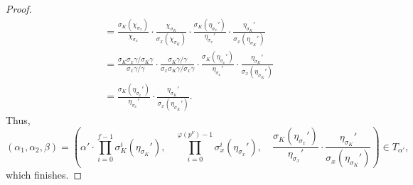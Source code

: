 \begin{proof}
\begin{align*}
		&= \frac{\sigma_K\left(\chi_{\sigma_x}\right)}{\chi_{\sigma_x}}\cdot\frac{\chi_{\sigma_K}}{\sigma_x\left(\chi_{\sigma_K}\right)}\cdot\frac{\sigma_K\left(\eta_{\sigma_x}'\right)}{\eta_{\sigma_x}'}\cdot\frac{\eta_{\sigma_K}'}{\sigma_x\left(\eta_{\sigma_K}'\right)} \\
		&= \frac{\sigma_K\sigma_x\gamma/\sigma_K\gamma}{\sigma_x\gamma/\gamma}\cdot\frac{\sigma_K\gamma/\gamma}{\sigma_x\sigma_K\gamma/\sigma_x\gamma}\cdot\frac{\sigma_K\left(\eta_{\sigma_x}'\right)}{\eta_{\sigma_x}'}\cdot\frac{\eta_{\sigma_K}'}{\sigma_x\left(\eta_{\sigma_K}'\right)} \\
		&= \frac{\sigma_K\left(\eta_{\sigma_x}'\right)}{\eta_{\sigma_x}'}\cdot\frac{\eta_{\sigma_K}'}{\sigma_x\left(\eta_{\sigma_K}'\right)}.
	\end{align*}
	Thus,
	\[(\alpha_1,\alpha_2,\beta)=\left(\alpha'\cdot\prod_{i=0}^{f-1}\sigma_K^i\left(\eta_{\sigma_K}'\right),\quad\prod_{i=0}^{\varphi\left(p^\nu\right)-1}\sigma_x^i\left(\eta_{\sigma_x}'\right),\quad\frac{\sigma_K\left(\eta_{\sigma_x}'\right)}{\eta_{\sigma_x}'}\cdot\frac{\eta_{\sigma_K}'}{\sigma_x\left(\eta_{\sigma_K}'\right)}\right)\in T_{\alpha'},\]
	which finishes.
\end{proof}